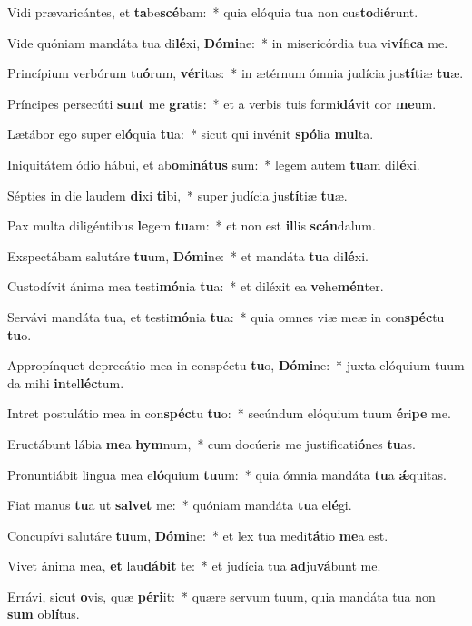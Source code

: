 \item Vidi prævaricántes, et \textbf{ta}be\textbf{scé}bam:~* quia elóquia tua non cus\textbf{to}di\textbf{é}runt.
\item Vide quóniam mandáta tua di\textbf{lé}xi, \textbf{Dó}\textbf{mi}ne:~* in misericórdia tua vi\textbf{ví}fi\textbf{ca} me.
\item Princípium verbórum tu\textbf{ó}rum, \textbf{vé}\textbf{ri}tas:~* in ætérnum ómnia judícia jus\textbf{tí}tiæ \textbf{tu}æ.
\item Príncipes persecúti \textbf{sunt} me \textbf{gra}tis:~* et a verbis tuis formi\textbf{dá}vit cor \textbf{me}um.
\item Lætábor ego super e\textbf{ló}quia \textbf{tu}a:~* sicut qui invénit \textbf{spó}lia \textbf{mul}ta.
\item Iniquitátem ódio hábui, et ab\textbf{o}mi\textbf{ná}\textbf{tus} sum:~* legem autem \textbf{tu}am di\textbf{lé}xi.
\item Sépties in die laudem \textbf{di}xi \textbf{ti}bi,~* super judícia jus\textbf{tí}tiæ \textbf{tu}æ.
\item Pax multa diligéntibus \textbf{le}gem \textbf{tu}am:~* et non est \textbf{il}lis \textbf{scán}dalum.
\item Exspectábam salutáre \textbf{tu}um, \textbf{Dó}\textbf{mi}ne:~* et mandáta \textbf{tu}a di\textbf{lé}xi.
\item Custodívit ánima mea testi\textbf{mó}nia \textbf{tu}a:~* et diléxit ea \textbf{ve}he\textbf{mén}ter.
\item Servávi mandáta tua, et testi\textbf{mó}nia \textbf{tu}a:~* quia omnes viæ meæ in con\textbf{spéc}tu \textbf{tu}o.
\item Appropínquet deprecátio mea in conspéctu \textbf{tu}o, \textbf{Dó}\textbf{mi}ne:~* juxta elóquium tuum da mihi \textbf{in}tel\textbf{léc}tum.
\item Intret postulátio mea in con\textbf{spéc}tu \textbf{tu}o:~* secúndum elóquium tuum \textbf{é}ri\textbf{pe} me.
\item Eructábunt lábia \textbf{me}a \textbf{hym}num,~* cum docúeris me justificati\textbf{ó}nes \textbf{tu}as.
\item Pronuntiábit lingua mea e\textbf{ló}quium \textbf{tu}um:~* quia ómnia mandáta \textbf{tu}a \textbf{ǽ}quitas.
\item Fiat manus \textbf{tu}a ut \textbf{sal}\textbf{vet} me:~* quóniam mandáta \textbf{tu}a e\textbf{lé}gi.
\item Concupívi salutáre \textbf{tu}um, \textbf{Dó}\textbf{mi}ne:~* et lex tua medi\textbf{tá}tio \textbf{me}a est.
\item Vivet ánima mea, \textbf{et} lau\textbf{dá}\textbf{bit} te:~* et judícia tua \textbf{ad}ju\textbf{vá}bunt me.
\item Errávi, sicut \textbf{o}vis, quæ \textbf{pér}\textbf{i}it:~* quære servum tuum, quia mandáta tua non \textbf{sum} ob\textbf{lí}tus.
